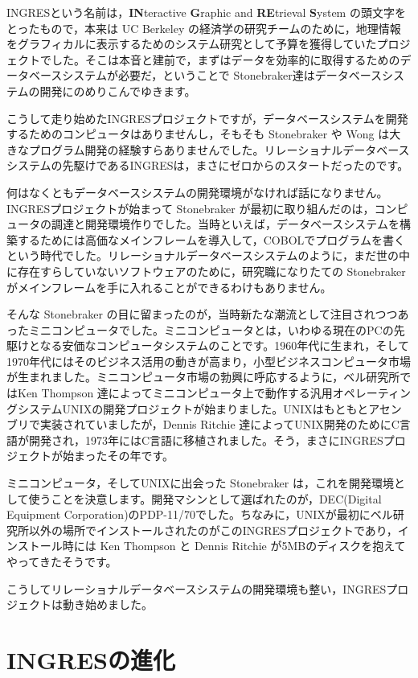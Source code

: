 INGRESという名前は，{\bf IN}teractive {\bf G}raphic and {\bf RE}trieval {\bf S}ystem の頭文字をとったもので，本来は UC Berkeley の経済学の研究チームのために，地理情報をグラフィカルに表示するためのシステム研究として予算を獲得していたプロジェクトでした。そこは本音と建前で，まずはデータを効率的に取得するためのデータベースシステムが必要だ，ということで Stonebraker達はデータベースシステムの開発にのめりこんでゆきます。


こうして走り始めたINGRESプロジェクトですが，データベースシステムを開発するためのコンピュータはありませんし，そもそも Stonebraker や Wong は大きなプログラム開発の経験すらありませんでした。リレーショナルデータベースシステムの先駆けであるINGRESは，まさにゼロからのスタートだったのです。


何はなくともデータベースシステムの開発環境がなければ話になりません。INGRESプロジェクトが始まって Stonebraker が最初に取り組んだのは，コンピュータの調達と開発環境作りでした。当時といえば，データベースシステムを構築するためには高価なメインフレームを導入して，COBOLでプログラムを書くという時代でした。リレーショナルデータベースシステムのように，まだ世の中に存在すらしていないソフトウェアのために，研究職になりたての Stonebraker がメインフレームを手に入れることができるわけもありません。


そんな Stonebraker の目に留まったのが，当時新たな潮流として注目されつつあったミニコンピュータでした。ミニコンピュータとは，いわゆる現在のPCの先駆けとなる安価なコンピュータシステムのことです。1960年代に生まれ，そして1970年代にはそのビジネス活用の動きが高まり，小型ビジネスコンピュータ市場が生まれました。ミニコンピュータ市場の勃興に呼応するように，ベル研究所ではKen Thompson 達によってミニコンピュータ上で動作する汎用オペレーティングシステムUNIXの開発プロジェクトが始まりました。UNIXはもともとアセンブリで実装されていましたが，Dennis Ritchie 達によってUNIX開発のためにC言語が開発され，1973年にはC言語に移植されました。そう，まさにINGRESプロジェクトが始まったその年です。


ミニコンピュータ，そしてUNIXに出会った Stonebraker は，これを開発環境として使うことを決意します。開発マシンとして選ばれたのが，DEC(Digital Equipment Corporation)のPDP-11/70でした。ちなみに，UNIXが最初にベル研究所以外の場所でインストールされたのがこのINGRESプロジェクトであり，インストール時には Ken Thompson と Dennis Ritchie が5MBのディスクを抱えてやってきたそうです。


こうしてリレーショナルデータベースシステムの開発環境も整い，INGRESプロジェクトは動き始めました。


\section{INGRESの進化}


